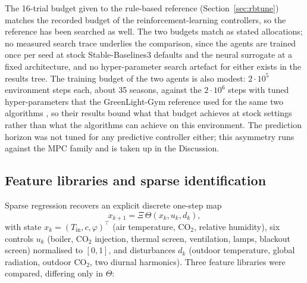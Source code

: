 The 16-trial budget given to the rule-based reference (Section~\ref{sec:rbtune}) matches
the recorded budget of the reinforcement-learning controllers, so the reference has been
searched as well. The two budgets match as stated allocations; no measured search trace
underlies the comparison, since the agents are trained once per seed at stock
Stable-Baselines3 defaults and the neural surrogate at a fixed architecture, and no
hyper-parameter search artefact for either exists in the results tree. The training
budget of the two agents is also modest: $2\cdot10^{5}$ environment steps each, about 35
seasons, against the $2\cdot10^{6}$ steps with tuned hyper-parameters that the
GreenLight-Gym reference used for the same two algorithms \cite{vanlaatum2025}, so their
results bound what that budget achieves at stock settings rather than what the algorithms
can achieve on this environment. The prediction
horizon was not tuned for any predictive controller either; this asymmetry runs
against the MPC family and is taken up in the Discussion.

\subsection{Feature libraries and sparse identification}
\label{sec:sindy}

Sparse regression \cite{brunton2016,brunton2016c,kaiser2018} recovers an explicit
discrete one-step map
%
\begin{equation}
x_{k+1}=\Xi\,\Theta(x_k,u_k,d_k),
\end{equation}
%
with state $x_k=(T_{\mathrm{in}},c,\varphi)^{\top}$ (air temperature, CO$_2$, relative
humidity), six controls $u_k$ (boiler, CO$_2$ injection, thermal screen, ventilation,
lamps, blackout screen) normalised to $[0,1]$, and disturbances $d_k$ (outdoor
temperature, global radiation, outdoor CO$_2$, two diurnal harmonics). Three feature
libraries were compared, differing only in $\Theta$:

